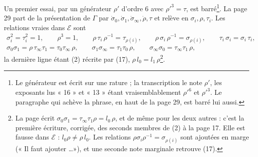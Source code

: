 \documentclass[11pt,a4paper]{article}
\begin{document}
Un premier essai, par un générateur $\rho'$ d'ordre $6$ avec $\rho'^3 = \tau$,
est barré\footnote{Le générateur est écrit sur une rature ; la transcription le
note $\rho'$, les exposants lus « 16 » et « 13 » étant vraisemblablement
$\rho'^6$ et $\rho'^3$. Le paragraphe qui achève la phrase, en haut de la page
29, est barré lui aussi.}. La page 29 part de la présentation de $\Gamma$ par
$\dot\sigma_0, \dot\sigma_1, \dot\sigma_\infty, \dot\rho, \tau$ et relève en
$\sigma_i, \rho, \tau_i$. Les relations vraies dans $\mathcal{E}$ sont
\[
\begin{gathered}
\sigma_i^2 = \tau_i^2 = 1, \qquad \rho^3 = 1, \qquad
\rho\,\tau_i\,\rho^{-1} = \tau_{\rho(i)}, \qquad
\rho\,\sigma_i\,\rho^{-1} = \sigma_{\rho(i)}, \qquad
\tau_i\,\sigma_i = \sigma_i\,\tau_i, \\
\sigma_0\sigma_1 = \rho\,\tau_\infty\tau_1 = \tau_0\tau_\infty\,\rho, \qquad
\sigma_1\sigma_\infty = \tau_1\tau_0\,\rho, \qquad
\sigma_\infty\sigma_0 = \tau_\infty\tau_1\,\rho,
\end{gathered}
\]
la dernière ligne étant (2) récrite par (17), $\rho\, l_0 = l_1\,\rho$\footnote{La
page écrit $\sigma_0\sigma_1 = \tau_\infty\tau_1\rho = l_0\,\rho$, et de même
pour les deux autres : c'est la première écriture, corrigée, des seconds
membres de (2) à la page 17. Elle est fausse dans $\mathcal{E}$ : $l_0\rho \neq
\rho\, l_0$. Les relations $\rho\sigma_i\rho^{-1} = \sigma_{\rho(i)}$ sont
ajoutées en marge (« Il faut ajouter \ldots »), et une seconde note marginale
retrouve (17).}.
\end{document}
